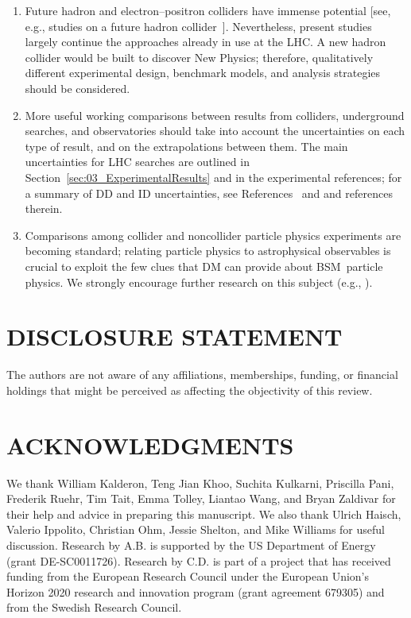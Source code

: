 \documentclass{ar-1col}
\begin{document}
{\begin{issues}
\begin{enumerate}
\begin{itemize}
 \end{itemize} 

\item Future hadron and electron--positron colliders have immense
potential [see, e.g., studies on a future hadron
collider~\cite{Golling:2016gvc}]. Nevertheless, present studies
largely continue the approaches already in use at the LHC. A new
hadron collider would be built to discover New Physics;
therefore, qualitatively different experimental design, benchmark
models, and analysis strategies should be considered.

\item More useful working comparisons between results from colliders,
underground searches, and observatories should take into account
the uncertainties on each type of result, and on the
extrapolations between them. The main uncertainties for LHC
searches are outlined in
Section~\ref{sec:03_ExperimentalResults} and in the experimental
references; for a summary of DD and ID uncertainties, see
References~ and  and
references therein.

\item Comparisons among collider and noncollider particle physics
experiments are becoming standard; relating particle physics to
astrophysical observables is crucial to exploit the few clues that
DM can provide about BSM\ particle physics. We
strongly encourage further research on this subject (e.g.,
).
 \end{enumerate} 
\end{issues}


\section*{DISCLOSURE STATEMENT}

The authors are not aware of any affiliations, memberships,
funding, or financial holdings that might be perceived as
affecting the objectivity of this review.

\section*{ACKNOWLEDGMENTS}

We thank William Kalderon, Teng Jian Khoo, Suchita Kulkarni,
Priscilla Pani, Frederik Ruehr, Tim Tait, Emma Tolley, Liantao Wang, and Bryan Zaldivar
for their help and advice in
preparing this manuscript. We also thank Ulrich Haisch, Valerio
Ippolito, Christian Ohm, Jessie Shelton, and Mike Williams for
useful discussion. Research by A.B. is supported by the US Department of
Energy (grant DE-SC0011726). Research by C.D. is part of a project that
has received funding from the European Research Council
under the European Union's Horizon 2020 research and innovation
program (grant agreement 679305) and from the Swedish
Research Council.
\\

}
\end{document}
